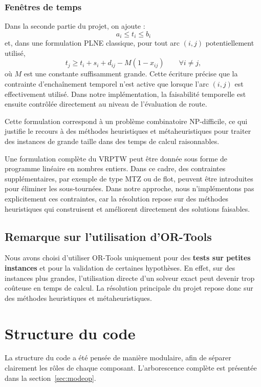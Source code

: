 \documentclass[11pt,a4paper]{article}
\begin{document}
\subsubsection{Fenêtres de temps}
Dans la seconde partie du projet, on ajoute :
\[
a_i \le t_i \le b_i
\]
et, dans une formulation PLNE classique, pour tout arc \((i,j)\) potentiellement utilisé,
\[
t_j \ge t_i + s_i + d_{ij} - M(1-x_{ij}) \qquad \forall i \neq j,
\]
où \(M\) est une constante suffisamment grande. Cette écriture précise que la contrainte d'enchaînement temporel n'est active que lorsque l'arc \((i,j)\) est effectivement utilisé. Dans notre implémentation, la faisabilité temporelle est ensuite contrôlée directement au niveau de l'évaluation de route.

Cette formulation correspond à un problème combinatoire NP-difficile, ce qui justifie le recours à des méthodes heuristiques et métaheuristiques pour traiter des instances de grande taille dans des temps de calcul raisonnables.

Une formulation complète du VRPTW peut être donnée sous forme de programme linéaire en nombres entiers. Dans ce cadre, des contraintes supplémentaires, par exemple de type MTZ ou de flot, peuvent être introduites pour éliminer les sous-tournées. Dans notre approche, nous n'implémentons pas explicitement ces contraintes, car la résolution repose sur des méthodes heuristiques qui construisent et améliorent directement des solutions faisables.

\subsection{Remarque sur l'utilisation d'OR-Tools}
Nous avons choisi d'utiliser OR-Tools uniquement pour des \textbf{tests sur petites instances} et pour la validation de certaines hypothèses. En effet, sur des instances plus grandes, l'utilisation directe d'un solveur exact peut devenir trop coûteuse en temps de calcul. La résolution principale du projet repose donc sur des méthodes heuristiques et métaheuristiques.

\section{Structure du code}

La structure du code a été pensée de manière modulaire, afin de séparer clairement les rôles de chaque composant. L'arborescence complète est présentée dans la section~\ref{sec:modeop}.
\end{document}
